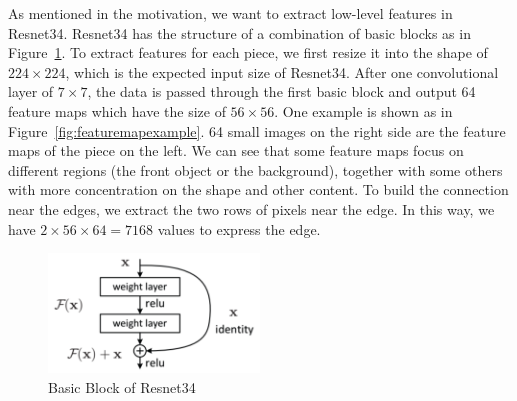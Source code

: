 \documentclass{article}
\begin{document}
As mentioned in the motivation, we want to extract low-level features in Resnet34\cite{he2016deep}. Resnet34 has the structure of a combination of basic blocks as in Figure~\ref{fig:basicblock}. To extract features for each piece, we first resize it into the shape of $224\times 224$, which is the expected input size of Resnet34. After one convolutional layer of $7\times7$, the data is passed through the first basic block and output 64 feature maps which have the size of $56\times 56$. One example is shown as in Figure~\ref{fig:featuremapexample}. 64 small images on the right side are the feature maps of the piece on the left. We can see that some feature maps focus on different regions (the front object or the background), together with some others with more concentration on the shape and other content. To build the connection near the edges, we extract the two rows of pixels near the edge. In this way, we have $2\times 56\times 64=7168$ values to express the edge.

\begin{figure}
    \centering
    \includegraphics[width=0.5\textwidth]{basicblock}
    \caption{Basic Block of Resnet34}
    \label{fig:basicblock}
\end{figure}
\end{document}
